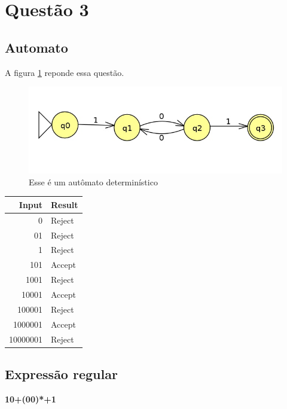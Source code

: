 \documentclass[11pt]{article}
\begin{document}
\section{Questão 3}
\label{sec:org3a2a781}
\subsection{Automato}
\label{sec:org936627f}
A figura \ref{fig:orgba3d54b} reponde essa questão. 

\begin{figure}[htbp]
\centering
\includegraphics[width=.9\linewidth]{./q3/q3.jpg}
\caption{\label{fig:orgba3d54b}
Esse é um autômato determinístico}
\end{figure}

\begin{center}
\begin{tabular}{rl}
Input & Result\\
\hline
0 & Reject\\
01 & Reject\\
1 & Reject\\
101 & Accept\\
1001 & Reject\\
10001 & Accept\\
100001 & Reject\\
1000001 & Accept\\
10000001 & Reject\\
\end{tabular}
\end{center}
\subsection{Expressão regular}
\label{sec:org3e26395}

\textbf{10+(00)*+1} 
\end{document}
